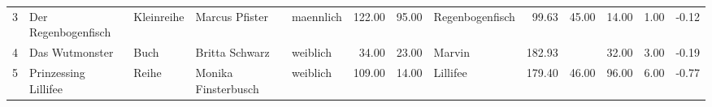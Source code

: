 \begin{sidewaystable}[ht]
\begin{center}
{\begin{tabular}{rllllrrlrrrrr}
  3 & Der Regenbogenfisch                                                                                                                                                                                                                                             & Kleinreihe & Marcus Pfister                                                                                                                                                                                                                                                  & maennlich & 122.00 & 95.00 & Regenbogenfisch                                                                                                                                                                                                                                                 & 99.63 & 45.00 & 14.00 & 1.00 & -0.12 \\ 
  4 & Das Wutmonster                                                                                                                                                                                                                                                  & Buch & Britta Schwarz                                                                                                                                                                                                                                                  & weiblich & 34.00 & 23.00 & Marvin                                                                                                                                                                                                                                                          & 182.93 &  & 32.00 & 3.00 & -0.19 \\ 
  5 & Prinzessing Lillifee                                                                                                                                                                                                                                            & Reihe & Monika Finsterbusch                                                                                                                                                                                                                                             & weiblich & 109.00 & 14.00 & Lillifee                                                                                                                                                                                                                                                        & 179.40 & 46.00 & 96.00 & 6.00 & -0.77 \\ 

\end{tabular}}
\end{center}
\end{sidewaystable}
